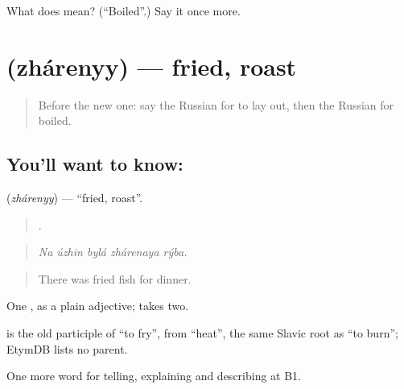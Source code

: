\begin{tcolorbox}[breakable,colback=teal!4,colframe=teal!35!black,title={Before you move on}]
What does  mean? (\textquotedblleft{}Boiled\textquotedblright{}.) Say it once more.
\end{tcolorbox}
\section[\texorpdfstring{\ru{жареный} (zhárenyy)}{жареный (zhárenyy)}]{ (zhárenyy) — fried, roast}

\label{lesson:RU-C336-zharenyy}



\begin{quote}
Before the new one: say the Russian for to lay out, then the Russian for boiled.
\end{quote}

\subsection*{You'll want to know: }
\textbf{} (\emph{zhárenyy}) — \textquotedblleft{}fried, roast\textquotedblright{}.

\begin{quote}
    .
\end{quote}

\begin{quote}
\emph{Na úzhin bylá zhárenaya rýba.}
\end{quote}

\begin{quote}
There was fried fish for dinner.
\end{quote}

One \emph{}, as a plain adjective; \emph{  } takes two.

\begin{cousinweb}
\emph{} is the old participle of \emph{} \textquotedblleft{}to fry\textquotedblright{}, from \emph{} \textquotedblleft{}heat\textquotedblright{}, the same Slavic root as \emph{} \textquotedblleft{}to burn\textquotedblright{}; EtymDB lists no parent.
\end{cousinweb}

\begin{grammarlens}[title={What you've built}]
One more word for telling, explaining and describing at B1.
\end{grammarlens}

